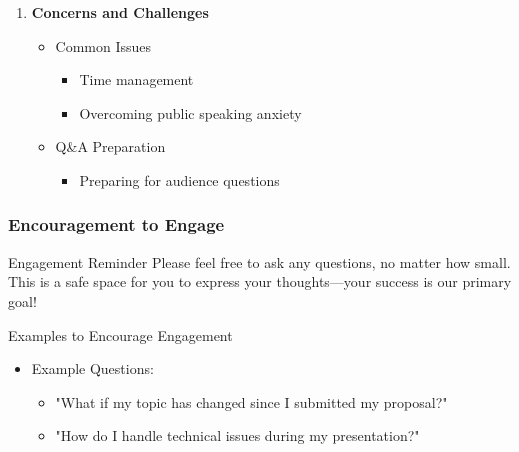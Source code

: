 \documentclass[aspectratio=169]{beamer}
\begin{document}
\begin{frame}[fragile]
\begin{enumerate}
        \item \textbf{Concerns and Challenges}
        \begin{itemize}
            \item Common Issues
            \begin{itemize}
                \item Time management
                \item Overcoming public speaking anxiety
            \end{itemize}
            \item Q\&A Preparation
                \begin{itemize}
                    \item Preparing for audience questions
                \end{itemize}
        \end{itemize}
    \end{enumerate}
\end{frame}

\begin{frame}[fragile]
    \frametitle{Encouragement to Engage}
    \begin{block}{Engagement Reminder}
        Please feel free to ask any questions, no matter how small. This is a safe space for you to express your thoughts—your success is our primary goal!
    \end{block}
    \begin{block}{Examples to Encourage Engagement}
        \begin{itemize}
            \item Example Questions:
            \begin{itemize}
                \item "What if my topic has changed since I submitted my proposal?"
                \item "How do I handle technical issues during my presentation?"
            \end{itemize}
        \end{itemize}
    \end{block}
\end{frame}
\end{document}
